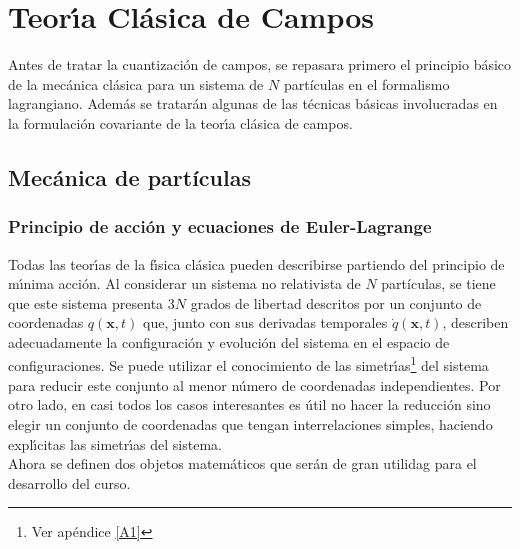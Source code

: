 


\chapter{Teor\'{\i}a Cl\'{a}sica de Campos} \label{capitulo_22}


Antes de tratar la cuantización de campos, se repasara primero el principio básico 
de la mecánica clásica para un sistema de $N$ partículas en el formalismo lagrangiano. Además se tratarán 
algunas de las t\'{e}cnicas b\'{a}sicas involucradas en la formulaci\'{o}n covariante de la teor\'{\i}a cl\'{a}sica de campos.

\section{Mecánica de partículas}

\subsection{Principio de acción y ecuaciones de Euler-Lagrange}
\vspace{0.1cm}
Todas las teor\'{\i}as de la f\'{\i}sica cl\'{a}sica pueden describirse partiendo del principio de m\'{\i}nima acci\'{o}n. Al considerar un sistema no relativista de $N$ partículas, se tiene que este sistema presenta $3N$ grados de libertad descritos por un conjunto de coordenadas $q(\mathbf{x},t)$ que, junto con sus derivadas temporales $\dot{q}(\mathbf{x},t)$, describen adecuadamente la configuraci\'{o}n y evoluci\'{o}n del sistema en el espacio de configuraciones. Se puede utilizar el conocimiento de las simetr\'{\i}as\footnote{Ver apéndice \ref{A1}} del sistema para reducir este conjunto al menor n\'{u}mero de coordenadas independientes. Por otro lado, en casi todos los casos interesantes es \'{u}til no hacer la reducci\'{o}n sino elegir un conjunto de coordenadas que tengan interrelaciones simples, haciendo expl\'{\i}citas las simetr\'{\i}as del sistema.\\

Ahora se definen dos objetos matem\'{a}ticos que ser\'{a}n de gran utilidag para el desarrollo del curso.\\



